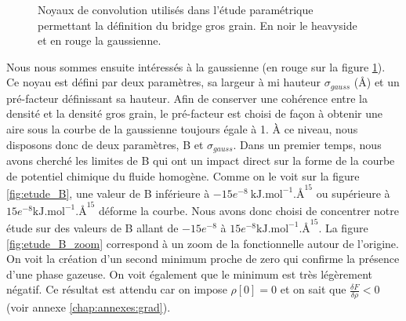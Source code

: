 
\begin{figure}[ht]
    \center    
    \caption[Noyaux de convolution utilisés dans l'étude paramétrique permettant la définition du bridge gros grain.]{Noyaux de convolution utilisés dans l'étude paramétrique permettant la définition du bridge gros grain. En noir le heavyside et en rouge la gaussienne.}
    \label{fig:noyaux}
\end{figure}



Nous nous sommes ensuite intéressés à la gaussienne (en rouge sur la figure \ref{fig:noyaux}).
Ce noyau est défini par deux paramètres, sa largeur à mi hauteur $\sigma_{gauss}$ (\AA) et un pré-facteur définissant sa hauteur.
Afin de conserver une cohérence entre la densité et la densité gros grain, le pré-facteur est choisi de façon à obtenir une aire sous la courbe de la gaussienne toujours égale à 1.
\`A ce niveau, nous disposons donc de deux paramètres, B et $\sigma_{gauss}$.
Dans un premier temps, nous avons cherché les limites de B qui ont un impact direct sur la forme de la courbe de potentiel chimique du fluide homogène.
Comme on le voit sur la figure \ref{fig:etude_B}, une valeur de B inférieure à $-15e^{-8}\  \mathrm{kJ.mol}^{-1}.\text{\AA}^{15}$ ou supérieure à $15e^{-8} \mathrm{kJ.mol}^{-1}.\text{\AA}^{15}$ déforme la courbe.
Nous avons donc choisi de concentrer notre étude sur des valeurs de B allant de $-15e^{-8}$ à $15e^{-8} \mathrm{kJ.mol}^{-1}.\text{\AA}^{15}$.
La figure \ref{fig:etude_B_zoom} correspond à un zoom de la fonctionnelle autour de l'origine. On voit la création d'un second minimum proche de zero qui confirme la présence d'une phase gazeuse. On voit également que le minimum est très légèrement négatif. Ce résultat est attendu car on impose $\rho[0]=0$ et on sait que $\frac{\delta F}{\delta \rho}<0$ (voir annexe \ref{chap:annexes:grad}).

